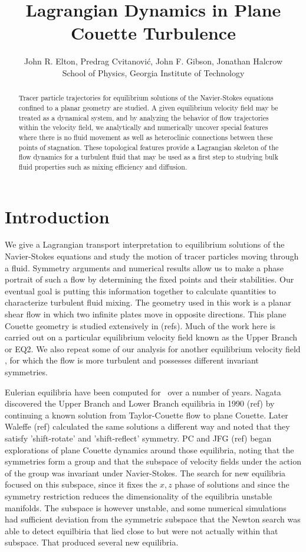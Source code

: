 \documentclass[letter,10pt,openany]{article}
\title{
Lagrangian Dynamics in Plane Couette Turbulence
        }
\author{
John R. Elton,
Predrag Cvitanovi\'{c},
John F. Gibson,
Jonathan Halcrow 
\vspace*{.15em}\\
  {\small School of Physics, Georgia Institute of Technology}
    }
\date{}
\begin{document}
\maketitle

\begin{abstract}
\noindent 
Tracer particle trajectories for equilibrium solutions of the Navier-Stokes equations confined to a planar geometry are studied. A given equilibrium velocity field may be treated as a dynamical system, and by analyzing the behavior of flow trajectories within the velocity field, we analytically and numerically uncover special features where there is no fluid movement as well as heteroclinic connections between these points of stagnation. These topological features provide a Lagrangian skeleton of the flow dynamics for a turbulent fluid that may be used as a first step to studying bulk fluid properties such as mixing efficiency and diffusion.
\end{abstract}



\section{Introduction}
\label{sec:intro}

We give a 
Lagrangian transport interpretation to equilibrium solutions of the Navier-Stokes equations and study the motion of tracer particles moving through a fluid.  Symmetry
arguments and numerical results allow us to make a phase portrait of such a flow by determining the fixed points and their stabilities.  Our eventual goal is putting this information
together to calculate quantities to characterize turbulent fluid mixing. The geometry used in this work is a planar shear flow in which two infinite plates move in opposite directions. This plane Couette geometry is studied extensively in (refs). Much of the work here is carried out on a particular equilibrium velocity field known as the Upper Branch or EQ2.
    We also repeat some of our analysis  for another equilibrium velocity field \tEQeight, for which the flow is more turbulent
    and possesses different invariant symmetries.


Eulerian equilibria have been computed for \pCf\ over a number of years. Nagata discovered the Upper Branch and Lower Branch equilibria in
1990 (ref) by continuing a known solution from Taylor-Couette flow to plane
Couette. Later Waleffe (ref)
calculated the same solutions a different way and noted that they
satisfy 'shift-rotate' and 'shift-reflect' symmetry. PC and JFG (ref) began explorations of plane Couette dynamics around
those equilibria, noting that the symmetries form a group 
and that the subspace of velocity fields under the action of the group was invariant under Navier-Stokes.
The search for new equilibria focused on this subspace, since it
fixes the $x,z$ phase of solutions and since the symmetry restriction
reduces the dimensionality of the equilibria unstable manifolds. The subspace is however unstable, and
some numerical simulations had sufficient deviation from the symmetric
subspace that the Newton search was able to detect equilbiria that lied
close to but were not actually within that subspace. That produced several new equilibria.
\end{document}
